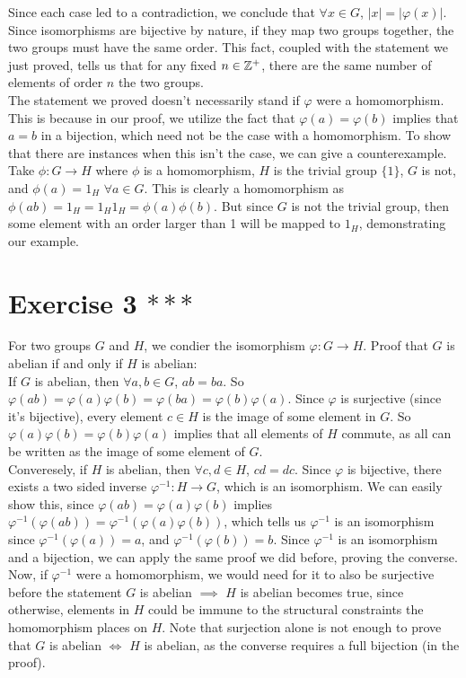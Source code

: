 \documentclass[12pt]{article}
\begin{document}
    Since each case led to a contradiction,
    we conclude that $\forall x \in G$, $|x| = |\varphi(x)|$. \\
    Since isomorphisms are bijective by nature,
    if they map two groups together,
    the two groups must have the same order.
    This fact, coupled with the statement we just proved,
    tells us that for any fixed $n \in \mathbb{Z}^+$,
    there are the same number of elements of order $n$ the two groups. \\
    The statement we proved doesn't necessarily stand
    if $\varphi$ were a homomorphism.
    This is because in our proof, we utilize the fact that
    $\varphi(a) = \varphi(b)$ implies that $a = b$ in a bijection,
    which need not be the case with a homomorphism.
    To show that there are instances when this isn't the case,
    we can give a counterexample. \\
    Take $\phi: G \to H$ where $\phi$ is a homomorphism,
    $H$ is the trivial group $\{1\}$, $G$ is not,
    and $\phi(a) = 1_H$ $\forall a \in G$.
    This is clearly a homomorphism
    as $\phi(ab) = 1_H = 1_H1_H = \phi(a)\phi(b)$.
    But since $G$ is not the trivial group,
    then some element with an order larger than 1 will be mapped to $1_H$,
    demonstrating our example.


    \section*{Exercise 3 $***$}
    For two groups $G$ and $H$, we condier the isomorphism $\varphi: G \to H$.
    Proof that $G$ is abelian if and only if $H$ is abelian: \\
    If $G$ is abelian,
    then $\forall a, b \in G$, $ab = ba$.
    So $\varphi(ab) = \varphi(a)\varphi(b)
    = \varphi(ba)
    = \varphi(b)\varphi(a)$.
    Since $\varphi$ is surjective (since it's bijective),
    every element $c \in H$ is the image of some element in $G$.
    So $\varphi(a)\varphi(b) = \varphi(b)\varphi(a)$
    implies that all elements of $H$ commute,
    as all can be written as the image of some element of $G$. \\
    Converesely, if $H$ is abelian, 
    then $\forall c, d \in H$, $cd = dc$.
    Since $\varphi$ is bijective,
    there exists a two sided inverse $\varphi^{-1}: H \to G$,
    which is an isomorphism.
    We can easily show this,
    since $\varphi(ab) = \varphi(a)\varphi(b)$
    implies $\varphi^{-1}(\varphi(ab)) = \varphi^{-1}(\varphi(a)\varphi(b))$,
    which tells us $\varphi^{-1}$ is an isomorphism
    since $\varphi^{-1}(\varphi(a)) = a$,
    and $\varphi^{-1}(\varphi(b)) = b$.
    Since $\varphi^{-1}$ is an isomorphism and a bijection,
    we can apply the same proof we did before, proving the converse. \\
    Now, if $\varphi^{-1}$ were a homomorphism,
    we would need for it to also be surjective before the statement
    $G$ is abelian $\implies$ $H$ is abelian becomes true,
    since otherwise, elements in $H$ could be immune to the structural
    constraints the homomorphism places on $H$.
    Note that surjection alone is not enough to prove that 
    $G$ is abelian $\iff$ $H$ is abelian,
    as the converse requires a full bijection (in the proof). 
\end{document}
